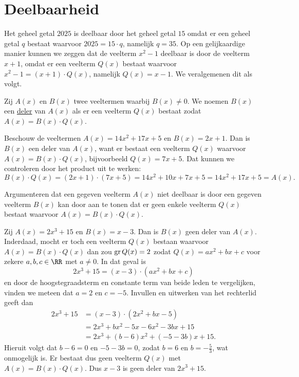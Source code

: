 \documentclass{ximera}
\begin{document}
\section{Deelbaarheid}

Het geheel getal $2025$ is deelbaar door het geheel getal $15$ omdat er een geheel getal $q$ bestaat waarvoor $2025 = 15\cdot q$, namelijk $q = 35$. Op een gelijkaardige manier kunnen we zeggen dat de veelterm $x^2-1$ deelbaar is door de veelterm $x+1$, omdat er een veelterm $Q(x)$ bestaat waarvoor $x^2-1 = (x+1)\cdot Q(x)$, namelijk $Q(x) = x-1$. We veralgemenen dit als volgt.

\begin{definition}[in woorden]\label{definitie:deler}
Zij $A(x)$ en $B(x)$ twee veeltermen waarbij $B(x) \neq 0$. 
We noemen $B(x)$ een \underline{deler} van $A(x)$ als er een veelterm $Q(x)$ bestaat zodat $A(x) = B(x)\cdot Q(x)$.
\end{definition}

\begin{example}
Beschouw de veeltermen $A(x) = 14x^2+17x+5$ en $B(x) = 2x+1$. Dan is $B(x)$ een deler van $A(x)$, want er bestaat een veelterm $Q(x)$ waarvoor $A(x) = B(x) \cdot Q(x)$, bijvoorbeeld $Q(x) = 7x+5$. Dat kunnen we controleren door het product %
uit te werken:
\[
B(x) \cdot Q(x) = (2x+1) \cdot (7x+5) = 14x^2 + 10x + 7x + 5 = 14x^2 + 17x + 5 = A(x).
\]
\end{example}

Argumenteren dat een gegeven veelterm $A(x)$ niet deelbaar is door een gegeven veelterm $B(x)$ kan door aan te tonen dat er geen enkele veelterm $Q(x)$ bestaat waarvoor $A(x) = B(x) \cdot Q(x)$. 

\begin{example} \label{geendeler}
Zij $A(x) = 2x^3+15$ en $B(x) = x-3$. Dan is $B(x)$ geen deler van $A(x)$. Inderdaad, mocht er toch een veelterm $Q(x)$ bestaan waarvoor $A(x) = B(x) \cdot Q(x)$ dan zou $\operatorname{gr} Q(x) = 2$ zodat $Q(x) = a x^2 + b x + c$ voor zekere $a,b,c \in \RR$ met $a \neq 0$. In dat geval is
\[
2x^3+15 = (x-3) \cdot (a x^2 + b x + c) 
\]
en door de hoogstegraadsterm en constante term van beide leden te vergelijken, vinden we meteen dat $a = 2$ en $c = -5$. Invullen en uitwerken van het rechterlid geeft dan
\begin{align*}
2x^3+15 
& = (x-3) \cdot (2 x^2 + b x - 5) \\
& = 2x^3 + bx^2 - 5x - 6x^2 - 3bx + 15 \\
& = 2x^3 + (b-6)x^2 + (-5-3b)x + 15.
\end{align*}
Hieruit volgt dat $b - 6 = 0$ en $-5-3b = 0$, zodat $b = 6$ en $b = -\frac{5}{3}$, wat onmogelijk is. Er bestaat dus geen veelterm $Q(x)$ met $A(x) = B(x) \cdot Q(x)$. Dus $x-3$ is geen deler van $2x^3+15$. 
\end{example}
\end{document}
